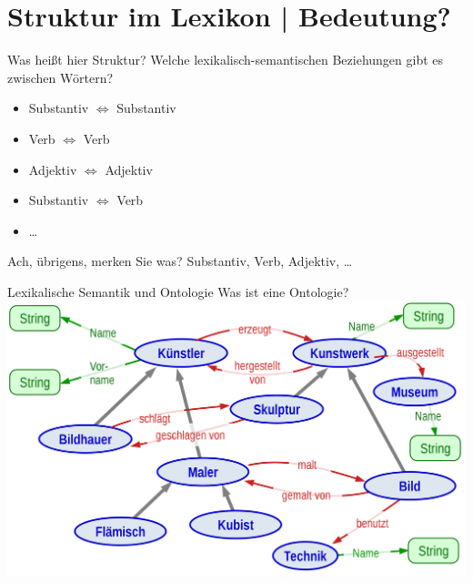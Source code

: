 \section{Struktur im Lexikon | Bedeutung?}

\begin{frame}
  {Was heißt hier Struktur?}
  \onslide<+->
  Welche \alert{lexikalisch-semantischen Beziehungen} gibt es zwischen Wörtern?\\
  \onslide<+->
  \Halbzeile
  \begin{itemize}[<+->]
    \item Substantiv $\Leftrightarrow$ Substantiv
    \item Verb $\Leftrightarrow$ Verb
    \item Adjektiv $\Leftrightarrow$ Adjektiv
    \item Substantiv $\Leftrightarrow$ Verb
    \item \ldots
  \end{itemize}
  \onslide<+->
  \Zeile
  Ach, übrigens, merken Sie was? \onslide<+-> \alert{Substantiv, Verb, Adjektiv, \ldots}
\end{frame}

\begin{frame}
  {Lexikalische Semantik und Ontologie}
  \onslide<+->
  Was ist eine Ontologie?\\
  \onslide<+->
  \Zeile
  \centering 
  \includegraphics[height=0.7\textheight]{graphics/onto_typ}\\
  \Viertelzeile
\end{frame}

